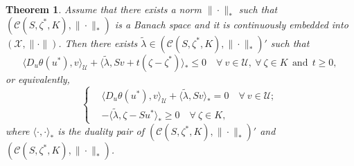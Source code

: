 \documentclass[leqno]{amsart}
\newtheorem{theorem}{Theorem}[section]
\theoremstyle{definition}
\begin{document}
\begin{theorem}\label{thm:R_KKT}
Assume that there exists a norm $\|\cdot\|_*$ such that $(\mathcal{C}(S, \zeta^*, K), \|\cdot\|_*)$ is a Banach space and it is continuously embedded into $(\mathcal{X}, \|\cdot\|)$. Then there exists $\tilde{\lambda}\in (\mathcal{C}(S, \zeta^*, K), \|\cdot\|_*)'$ such that
\begin{equation}\label{eq:R_plm}
\langle D_u\theta(u^*), v\rangle_\mathcal{U}  + \langle \tilde{\lambda}, Sv + t(\zeta - \zeta^*)\rangle_* \leq 0\quad \forall\ v\in \mathcal{U},\ \forall\ \zeta\in K\ \ \mbox{and}\ \ t\geq 0,
\end{equation}
 or equivalently,
\begin{equation}\label{eq:R_KKT}
\left\{
\begin{aligned}
&\langle D_u\theta(u^*), v\rangle_\mathcal{U}  + \langle \tilde{\lambda}, Sv\rangle_* = 0\quad \forall\ v\in \mathcal{U};\\
& -\langle \tilde{\lambda}, \zeta - Su^*\rangle_* \geq 0\quad \forall\ \zeta\in K,
\end{aligned}
\right.
\end{equation}
where $\langle\cdot, \cdot\rangle_*$ is the duality pair of $(\mathcal{C}(S, \zeta^*, K), \|\cdot\|_*)'$ and $(\mathcal{C}(S, \zeta^*, K), \|\cdot\|_*)$. 
\end{theorem}
\end{document}
